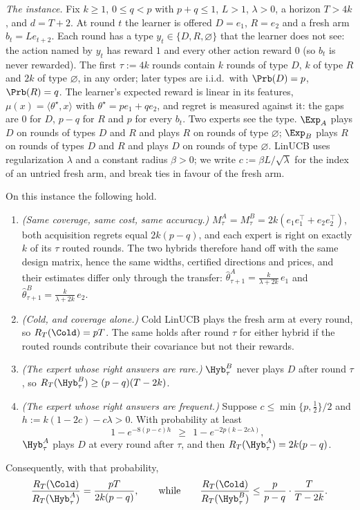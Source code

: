 \emph{The instance.} Fix $k\ge1$, $0\le q<p$ with $p+q\le1$, $L>1$,
$\lambda>0$, a horizon $T>4k$, and $d=T+2$. At round $t$ the learner is
offered $D=e_1$, $R=e_2$ and a fresh arm $b_t=Le_{t+2}$. Each round has a type
$y_t\in\{D,R,\varnothing\}$ that the learner does not see: the action named by
$y_t$ has reward $1$ and every other action reward $0$ (so $b_t$ is never
rewarded). The first $\tau:=4k$ rounds contain $k$ rounds of type $D$, $k$ of
type $R$ and $2k$ of type $\varnothing$, in any order; later types are
i.i.d.\ with $\Prb(D)=p$, $\Prb(R)=q$. The learner's expected reward is linear
in its features, $\mu(x)=\langle\theta^\star,x\rangle$ with
$\theta^\star=pe_1+qe_2$, and regret is measured against it: the gaps are
$0$ for $D$, $p-q$ for $R$ and $p$ for every $b_t$. Two experts see the type.
$\Exp_A$ plays $D$ on rounds of types $D$ and $R$ and plays $R$ on rounds of
type $\varnothing$; $\Exp_B$ plays $R$ on rounds of types $D$ and $R$ and plays
$D$ on rounds of type $\varnothing$. LinUCB uses regularization $\lambda$ and a
constant radius $\beta>0$; we write $c:=\beta L/\sqrt\lambda$ for the index of
an untried fresh arm, and break ties in favour of the fresh arm.

\begin{theorem}
\label{thm:transfer-separation}
On this instance the following hold.
\begin{enumerate}[itemsep=1pt,topsep=1pt,leftmargin=*]
\item[(i)] \emph{(Same coverage, same cost, same accuracy.)}
$M_\tau^{A}=M_\tau^{B}=2k(e_1e_1^\top+e_2e_2^\top)$, both acquisition regrets
equal $2k(p-q)$, and each expert is right on exactly $k$ of its $\tau$ routed
rounds. The two hybrids therefore hand off with the same design matrix, hence
the same widths, certified directions and prices, and their estimates differ
only through the transfer:
$\widehat\theta^{A}_{\tau+1}=\frac{k}{\lambda+2k}\,e_1$ and
$\widehat\theta^{B}_{\tau+1}=\frac{k}{\lambda+2k}\,e_2$.
\item[(ii)] \emph{(Cold, and coverage alone.)} Cold LinUCB plays the fresh arm
at every round, so $R_T(\Cold)=pT$. The same holds after round $\tau$ for
either hybrid if the routed rounds contribute their covariance but not their
rewards.
\item[(iii)] \emph{(The expert whose right answers are rare.)}
$\Hyb^{B}_\tau$ never plays $D$ after round $\tau$, so
$R_T(\Hyb^{B}_\tau)\ge(p-q)(T-2k)$.
\item[(iv)] \emph{(The expert whose right answers are frequent.)} Suppose
$c\le\min\{p,\tfrac12\}/2$ and $h:=k(1-2c)-c\lambda>0$. With probability at
least
\[
1-e^{-8(p-c)h}\ \ \ge\ \ 1-e^{-2p(k-2c\lambda)},
\]
$\Hyb^{A}_\tau$ plays $D$ at every round after $\tau$, and then
$R_T(\Hyb^{A}_\tau)=2k(p-q)$.
\end{enumerate}
Consequently, with that probability,
\[
\frac{R_T(\Cold)}{R_T(\Hyb^{A}_\tau)}=\frac{pT}{2k(p-q)},
\qquad\text{while}\qquad
\frac{R_T(\Cold)}{R_T(\Hyb^{B}_\tau)}\le\frac{p}{p-q}\cdot\frac{T}{T-2k}.
\]
\end{theorem}

